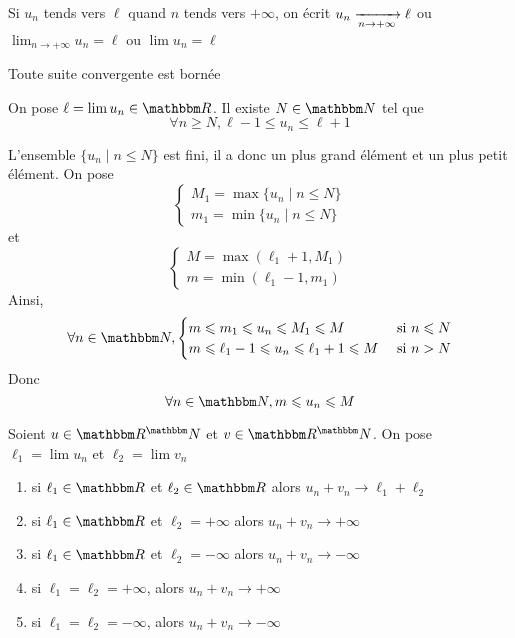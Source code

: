 \begin{rmk}
	Si $u_n$ tends vers  $\ell$ quand $n$ tends vers  $+\infty$, on écrit $u_n \xrightarrow[n \to +\infty]{} \ell$ ou $\lim_{n\to+\infty} u_n = \ell$ ou $\lim u_n = \ell$
\end{rmk}

\begin{prop}
	Toute suite convergente est bornée
\end{prop}

\begin{prv}
	On pose $\ell = \lim u_n \in \R$. Il existe $N \in \N$ tel que \[
	\forall n \ge  N, \ell-1 \le  u_n \le  \ell+1
	\]

	L'ensemble $\{ u_n  \mid n \le N\}$ est fini, il a donc un plus grand élément et un plus petit élément. On pose \[
		\begin{cases}
			M_1 = \max \{u_n  \mid n \le N\} \\
			m_1 = \min \{u_n  \mid n \le N\} 
		\end{cases}
	\] et \[
	\begin{cases}
		M = \max(\ell_1+1, M_1)\\
		m = \min(\ell_1-1, m_1)
	\end{cases}
	\]
	Ainsi, \[
	\forall n \in \N, \begin{cases}
		m \le m_1\le u_n \le  M_1 \le M &\text{ si } n \le N\\
		m \le \ell_1 - 1\le u_n \le \ell_1+1 \le M &\text{ si } n > N
	\end{cases}
	\]
	Donc \[
	\forall n \in \N, m \le  u_n \le  M
	\] 
\end{prv}

\begin{prop}
	Soient $u \in \R^\N$ et $v \in \R^\N$. On pose $\ell_1=\lim u_n$ et $\ell_2 = \lim v_n$ 
	\begin{enumerate}
		\item si $\ell_1\in \R$ et $\ell_2\in \R$ alors $u_n + v_n \to \ell_1+ \ell_2$
		\item si $\ell_1\in \R$ et $\ell_2 = +\infty$ alors $u_n + v_n \to +\infty$
		\item si $\ell_1\in \R$ et $\ell_2 = -\infty$ alors $u_n + v_n \to -\infty$
		\item si $\ell_1=\ell_2=+\infty$, alors $u_n + v_n \to +\infty$
		\item si $\ell_1=\ell_2=-\infty$, alors $u_n + v_n \to -\infty$
	\end{enumerate}
\end{prop}

